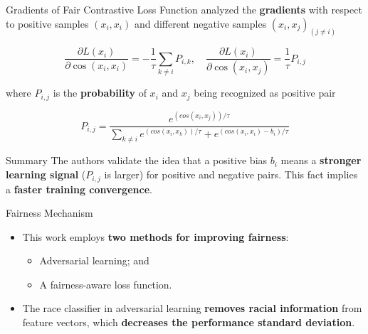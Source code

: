 \documentclass[aspectratio=169,xcolor=dvipsnames]{beamer}
\begin{document}
\begin{frame}{Gradients of Fair Contrastive Loss Function}
    \cite{R34} analyzed the \textbf{gradients} with respect to positive samples $(x_i, x_i)$ and different negative samples $(x_i, x_j)_{(j \neq i)}$
    
    \begin{equation}
        \frac{\partial L(x_i)}{\partial \cos(x_i, x_i)} = -\frac{1}{\tau} \sum_{k \neq i} P_{i,k}, \quad \frac{\partial L(x_i)}{\partial \cos(x_i, x_j)} = \frac{1}{\tau} P_{i,j} 
    \end{equation}

    where $P_{i, j}$ is the \textbf{probability} of $x_i$ and $x_j$ being recognized as positive pair

    \begin{equation}
        P_{i,j} = \frac{e^{\left(cos(x_i, x_j)\right) / \tau}}{\sum_{k \neq i} e^{\left(cos(x_i, x_k)\right) / \tau} + e^{\left(cos(x_i, x_i) - b_i\right) / \tau}}
    \end{equation}

    \begin{block}{Summary}
    The authors validate the idea that a positive bias $b_i$ means a \textbf{stronger learning signal} ($P_{i,j}$ is larger) for positive and negative pairs. This fact implies a \textbf{faster training convergence}.
    \end{block}
    
\end{frame}


\begin{frame}{Fairness Mechanism}
    \begin{itemize}
        \item This work employs \textbf{two methods for improving fairness}: 
        \begin{itemize}
            \item Adversarial learning; and
            \item A fairness-aware loss function. 
        \end{itemize}
        \item The race classifier in adversarial learning \textbf{removes racial information} from feature vectors, which \textbf{decreases the performance standard deviation}. 
    \end{itemize}
\end{frame}
\end{document}
